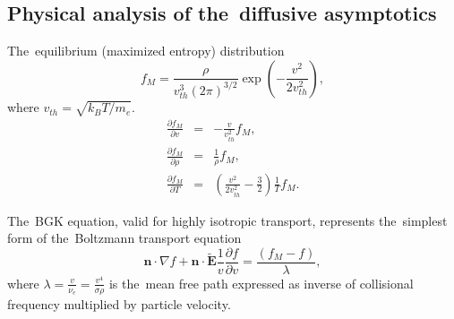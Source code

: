 \documentclass[review]{elsarticle}
\newcommand{\pdv}[2]{\frac{\partial{#1}}{\partial{#2}}}
\newcommand{\vect}[1]{\boldsymbol{#1}}
\newcommand{\mfp}{\lambda}
\newcommand{\nue}{\nu_{e}}
\newcommand{\vmag}{v}
\newcommand{\vth}{v_{th}}
\newcommand{\vn}{\vect{n}}
\newcommand{\tE}{\vect{\tilde{E}}}
\newcommand{\me}{m_e}
\newcommand{\kB}{k_B}
\newcommand{\crs}{\sigma}
\newcommand{\fM}{f_M}
\begin{document}
\subsection{Physical analysis of the~diffusive asymptotics}\label{sec:diffusive_asymptotics}
The~equilibrium (maximized entropy) distribution
\begin{equation}
  \fM = \frac{\rho}{\vth^3 \left( 2 \pi \right)^{3/2}} 
  \exp\left(- \frac{\vmag^2}{2 \vth^2} \right) ,
  \label{eq:MaxBol}
\end{equation}
where $\vth = \sqrt{\kB T/\me}$.
\begin{eqnarray}
  \pdv{\fM}{\vmag} &=& -\frac{\vmag}{\vth^2}\fM ,
  \nonumber \\
  \pdv{\fM}{\rho} &=& \frac{1}{\rho}\fM ,
  \nonumber \\
  \pdv{\fM}{T} &=& \left( \frac{\vmag^2}{2 \vth^2} - \frac{3}{2}\right)
  \frac{1}{T}\fM. 
\end{eqnarray}

The~BGK equation, valid for highly isotropic transport, represents 
the~simplest form of the~Boltzmann transport equation
\begin{equation}
  \vn\cdot\nabla f + \vn\cdot\tE\frac{1}{\vmag}\pdv{f}{\vmag} = 
  \frac{\left(\fM - f\right)}{\mfp} ,
  \label{eq:BGK}
\end{equation}
where $\mfp = \frac{\vmag}{\nue} = \frac{\vmag^4}{\crs\rho}$ is the~mean 
free path expressed as inverse of collisional frequency multiplied by 
particle velocity.
\end{document}
